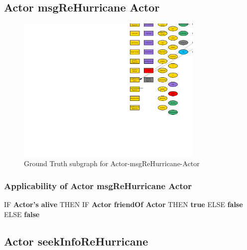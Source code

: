 \documentclass{article}%
\begin{document}
%
\subsection{Actor msgReHurricane Actor}%
\label{subsec:Actor msgReHurricane Actor}%


\begin{figure}[ht]%
\centering%
\includegraphics[width=0.8\textwidth]{images/Actor-msgReHurricane-Actor.png}%
\caption{Ground Truth subgraph for Actor{-}msgReHurricane{-}Actor}%
\end{figure}

%
\subsubsection{Applicability of Actor msgReHurricane Actor}%
\label{ssubsec:Applicability of Actor msgReHurricane Actor}%
\begin{flushleft}%
IF %
\textbf{Actor's alive}%
\linebreak%
\hspace*{2em}%
THEN %
IF %
\textbf{Actor friendOf Actor}%
\linebreak%
\hspace*{4em}%
THEN %
\textbf{true}%
\linebreak%
\hspace*{4em}%
ELSE %
\textbf{false}%
\linebreak%
\hspace*{2em}%
ELSE %
\textbf{false}%
\end{flushleft}

%
\subsection{Actor seekInfoReHurricane}%
\label{subsec:Actor seekInfoReHurricane}%
\end{document}
